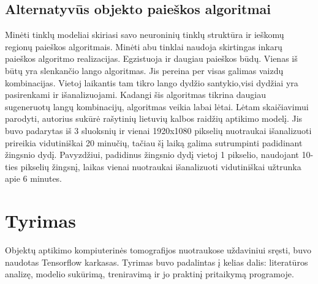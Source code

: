 \documentclass{VUMIFInfKursinis}
\begin{document}
\subsection{Alternatyvūs objekto paieškos algoritmai}
\par
Minėti tinklų modeliai skiriasi savo neuroninių tinklų struktūra ir ieškomų regionų
paieškos algoritmais. Minėti abu tinklai naudoja skirtingas inkarų paieškos algoritmo
realizacijas. Egzistuoja ir daugiau paieškos būdų. Vienas iš būtų yra slenkančio lango
algoritmas. Jis pereina per visas galimas vaizdų kombinacijas. Vietoj
laikantis tam tikro lango dydžio santykio,visi dydžiai yra pasirenkami ir išanalizuojami.
Kadangi šis algoritmas tikrina daugiau sugeneruotų langų kombinacijų, algoritmas veikia labai lėtai.
Lėtam skaičiavimui parodyti, autorius sukūrė rašytinių lietuvių kalbos raidžių aptikimo modelį. Jis buvo padarytas iš 3 sluoksnių
ir vienai 1920x1080 pikselių nuotraukai išanalizuoti prireikia vidutiniškai 20 minučių, tačiau
šį laiką galima sutrumpinti padidinant žingsnio dydį. Pavyzdžiui, padidinus žingsnio dydį vietoj
1 pikselio, naudojant 10-ties pikselių žingsnį, laikas vienai nuotraukai išanalizuoti
vidutiniškai užtrunka apie 6 minutes.

\section{Tyrimas}
\par
Objektų aptikimo kompiuterinės tomografijos nuotraukose uždaviniui sręsti,
buvo naudotas Tensorflow karkasas.
Tyrimas buvo padalintas į kelias dalis: literatūros analizę, modelio
sukūrimą, treniravimą ir jo praktinį pritaikymą programoje.
\end{document}

